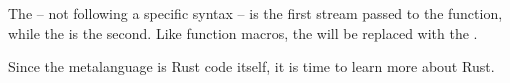 
The  -- not following a specific syntax -- is the first stream passed to the function, while the  is the second.
Like function macros, the  will be replaced with the .

Since the metalanguage is Rust code itself, it is time to learn more about Rust.


